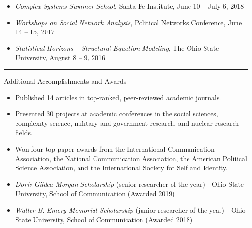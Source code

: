 \documentclass[letterpaper, 9pt]{extarticle}
\begin{document}
{\begin{itemize}[leftmargin=!,labelindent=-10pt,itemindent=0pt]
\vspace{-6pt}
\item \textit{Complex Systems Summer School}, Santa Fe Institute, June 10 -- July 6, 2018

\vspace{-6pt}
\item \textit{Workshops on Social Network Analysis}, Political Networks Conference, June 14 -- 15, 2017

\vspace{-6pt}
\item \textit{Statistical Horizons -- Structural Equation Modeling}, The Ohio State University, August 8 -- 9, 2016
\end{itemize}

\vspace{-7.5pt}

\rule{\textwidth}{0.25pt}
\raggedright

\vspace{-4pt}
\begin{center}
\large{Additional Accomplishments and Awards}
\end{center}

\begin{itemize}[leftmargin=!,labelindent=-10pt,itemindent=0pt]
\item Published 14 articles in top-ranked, peer-reviewed academic journals.

\vspace{-6pt}
\item Presented 30 projects at academic conferences in the social sciences, complexity science, military and government research, and nuclear research fields.

\vspace{-6pt}
\item Won four top paper awards from the International Communication Association, the National Communication Association, the American Political Science Association, and the International Society for Self and Identity.

\vspace{-6pt}
\item \textit{Doris Gildea Morgan Scholarship} (senior researcher of the year) - Ohio State University, School of Communication (Awarded 2019)

\vspace{-6pt}
\item \textit{Walter B. Emery Memorial Scholarship} (junior researcher of the year) - Ohio State University, School of Communication (Awarded 2018)


\end{itemize}}
\end{document}
